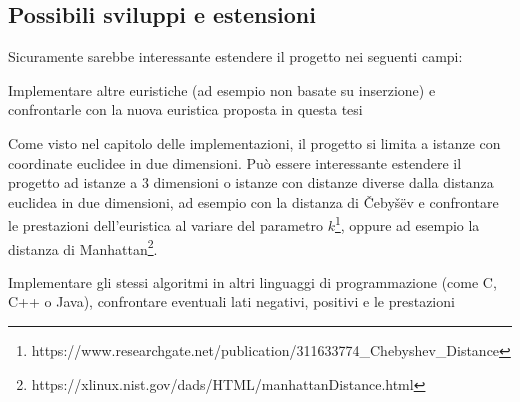 \documentclass[a4paper,12pt]{report}
\begin{document}
\subsection{Possibili sviluppi e estensioni}
Sicuramente sarebbe interessante estendere il progetto nei seguenti campi:
\begin{legal}
  \item Implementare altre euristiche (ad esempio non basate su inserzione) e confrontarle con la nuova euristica proposta in questa tesi
  \item Come visto nel capitolo delle implementazioni, il progetto si limita a istanze con coordinate euclidee in due dimensioni. Può essere interessante estendere il progetto ad istanze a 3 dimensioni o istanze con distanze diverse dalla distanza euclidea in due dimensioni, ad esempio con la distanza di Čebyšëv e confrontare le prestazioni dell'euristica al variare del parametro $k$\footnote{https://www.researchgate.net/publication/311633774\_Chebyshev\_Distance}, oppure ad esempio la distanza di Manhattan\footnote{https://xlinux.nist.gov/dads/HTML/manhattanDistance.html}.
  \item Implementare gli stessi algoritmi in altri linguaggi di programmazione (come C, C++ o Java), confrontare eventuali lati negativi, positivi e le prestazioni
\end{legal}
 
%
%
\end{document}
